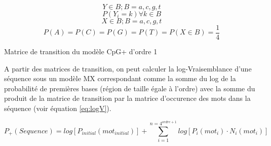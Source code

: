 \documentclass[10pt,a4paper,notitlepage,colorinlistoftodos]{article}
\begin{document}
\begin{multicols}{2}
\begin{equation}
Y \in B;  B = {a,c,g,t}
\label{eq:11}
\end{equation}
\begin{equation}
P(Y_i = k) \forall k \in B
\label{eq:12}
\end{equation}
\begin{equation}
X \in B;  B = {a,c,g,t}
\label{eq:21}
\end{equation}
\begin{equation}
P(A) = P(C) = P(G) = P(T) = P (X \in B) = \frac{1}{4}
\label{eq:22}
\end{equation}


\begin{table}
  \begin{center}
  
  \end{center}
  \caption{Matrice de transition du modèle CpG+ d'ordre 1}
  \label{tab:trans}
\end{table}  

A partir des matrices de transition, on peut calculer la log-Vraisemblance d’une séquence sous un modèle MX correspondant comme la somme du log de la probabilité de premières bases (région de taille égale à l’ordre) avec la somme du produit de la matrice de transition par la matrice d’occurence des mots dans la séquence (voir équation \ref{eq:logV}).

\end{multicols}

\begin{equation}
P_+(Sequence) = log\left[P_{initial}(mot_{initial})\right] + \sum_{i=1}^{n = 4^{ordre+1}} log\left[P_i(mot_{i}) \cdot N_i(mot_{i})\right]
\label{eq:logV}
\end{equation}
\end{document}
